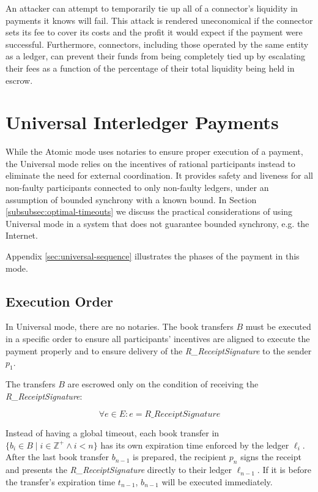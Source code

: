 \documentclass[letterpaper,twocolumn,10pt]{article}
\begin{document}
An attacker can attempt to temporarily tie up all of a connector's liquidity in payments it knows will fail. This attack is rendered uneconomical if the connector sets its fee to cover its costs and the profit it would expect if the payment were successful. Furthermore, connectors, including those operated by the same entity as a ledger, can prevent their funds from being completely tied up by escalating their fees as a function of the percentage of their total liquidity being held in escrow.

\newpage

\section{Universal Interledger Payments}
\label{sec:universal}

While the Atomic mode uses notaries to ensure proper execution of a payment, the Universal mode relies on the incentives of rational participants instead to eliminate the need for external coordination. It provides safety and liveness for all non-faulty participants connected to only non-faulty ledgers, under an assumption of bounded synchrony with a known bound. In Section \ref{subsubsec:optimal-timeouts} we discuss the practical considerations of using Universal mode in a system that does not guarantee bounded synchrony, e.g. the Internet.

Appendix \ref{sec:universal-sequence} illustrates the phases of the payment in this mode.


\subsection{Execution Order}

In Universal mode, there are no notaries. The book transfers $B$ must be executed in a specific order to ensure all participants' incentives are aligned to execute the payment properly and to ensure delivery of the \textit{R\_ReceiptSignature} to the sender $p_1$.

The transfers $B$ are escrowed only on the condition of receiving the \textit{R\_ReceiptSignature}:

\begin{equation}
\forall e \in E : e = \textit{R\_ReceiptSignature}
\end{equation}

Instead of having a global timeout, each book transfer in $ \{ b_i \in B \mid i \in \mathbb{Z}^+ \land i < n \} $ has its own expiration time enforced by the ledger $\ell_i$.
After the last book transfer $b_{n-1}$ is prepared, the recipient $p_n$ signs the receipt and presents the \textit{R\_ReceiptSignature} directly to their ledger $\ell_{n-1}$. If it is before the transfer's expiration time $t_{n-1}$, $b_{n-1}$ will be executed immediately.
\end{document}
